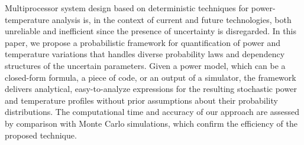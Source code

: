 Multiprocessor system design based on deterministic techniques for power-temperature analysis is, in the context of current and future technologies, both unreliable and inefficient since the presence of uncertainty is disregarded. In this paper, we propose a probabilistic framework for quantification of power and temperature variations that handles diverse probability laws and dependency structures of the uncertain parameters. Given a power model, which can be a closed-form formula, a piece of code, or an output of a simulator, the framework delivers analytical, easy-to-analyze expressions for the resulting stochastic power and temperature profiles without prior assumptions about their probability distributions. The computational time and accuracy of our approach are assessed by comparison with Monte Carlo simulations, which confirm the efficiency of the proposed technique.
